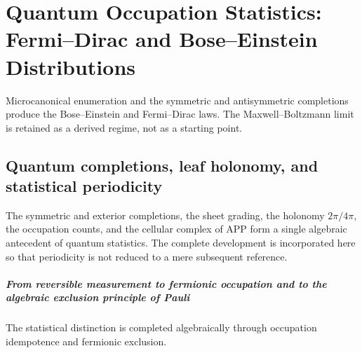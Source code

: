 \chapter{Quantum Occupation Statistics: Fermi–Dirac and Bose–Einstein Distributions}
\label{chap:parte-iv-55}

Microcanonical enumeration and the symmetric and antisymmetric completions produce the Bose--Einstein and Fermi--Dirac laws. The Maxwell--Boltzmann limit is retained as a derived regime, not as a starting point.



\section{Quantum completions, leaf holonomy, and statistical periodicity}

The symmetric and exterior completions, the sheet grading, the holonomy
\(2\pi/4\pi\), the occupation counts, and the cellular complex of APP form a
single algebraic antecedent of quantum statistics. The complete development is incorporated here
so that periodicity is not reduced to a mere
subsequent reference.

\begingroup
\let\chapter\section
\let\section\subsection
\let\subsection\subsubsection
\let\subsubsection\paragraph
\let\clearpage\relax
\let\cleardoublepage\relax

\endgroup

\paragraph{From reversible measurement to fermionic occupation and to the algebraic exclusion principle of Pauli} The statistical distinction is completed algebraically through occupation idempotence and fermionic exclusion.
